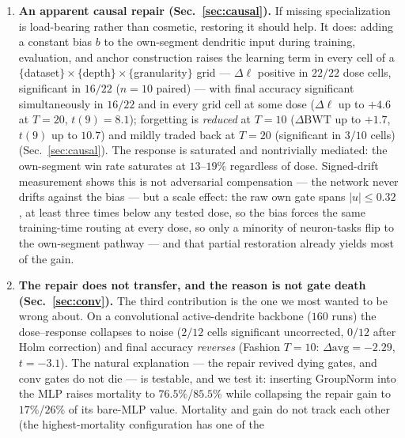 \documentclass[10pt]{article}
\begin{document}
\begin{enumerate}
      dominance by argmax over segment activations \emph{and} does not filter
      inactive units is at risk of the same artifact; we did not audit the
      instrumentation used in other work on this architecture.
\item \textbf{An apparent causal repair (Sec.~\ref{sec:causal}).} If missing
      specialization is load-bearing rather than cosmetic, restoring it
      should help. It does: adding a constant bias $b$ to the own-segment
      dendritic input during training, evaluation, and anchor
      construction raises the learning term in every cell of a
      $\{$dataset$\}\times\{$depth$\}\times\{$granularity$\}$ grid ---
      $\Delta\ell$ positive in $22/22$ dose cells, significant in $16/22$
      ($n{=}10$ paired) --- with final accuracy significant simultaneously
      in $16/22$ and in every grid cell at some dose ($\Delta\ell$ up to
      $+4.6$ at $T{=}20$, $t(9){=}8.1$); forgetting is \emph{reduced} at
      $T{=}10$ ($\Delta\mathrm{BWT}$ up to $+1.7$, $t(9)$ up to $10.7$) and
      mildly traded back at $T{=}20$ (significant in $3/10$ cells)
      (Sec.~\ref{sec:causal}). The response is saturated and nontrivially
      mediated: the own-segment win rate saturates at $13$--$19\%$
      regardless of dose. Signed-drift measurement shows this is not
      adversarial compensation --- the network never drifts against the bias
      --- but a scale effect: the raw own gate spans $|u| \le 0.32$, at least
      three times below any tested dose, so the bias forces the same
      training-time routing at every dose, so only a minority of neuron-tasks
      flip to the own-segment pathway --- and that partial restoration
      already yields most of the gain.
\item \textbf{The repair does not transfer, and the reason is not gate death
      (Sec.~\ref{sec:conv}).} The third contribution is the one we most
      wanted to be wrong about. On a convolutional active-dendrite backbone
      ($160$ runs) the dose--response collapses to noise ($2/12$ cells
significant uncorrected, $0/12$ after Holm correction) and final accuracy \emph{reverses} (Fashion $T{=}10$:
      $\Delta\mathrm{avg}=-2.29$, $t{=}-3.1$). The natural explanation ---
      the repair revived dying gates, and conv gates do not die --- is
      testable, and we test it: inserting GroupNorm into the MLP raises
      mortality to $76.5\%$/$85.5\%$ while collapsing the repair gain to
      $17\%$/$26\%$ of its bare-MLP value. Mortality and gain
      do not track each other (the highest-mortality configuration has one of the

\end{enumerate}
\end{document}
